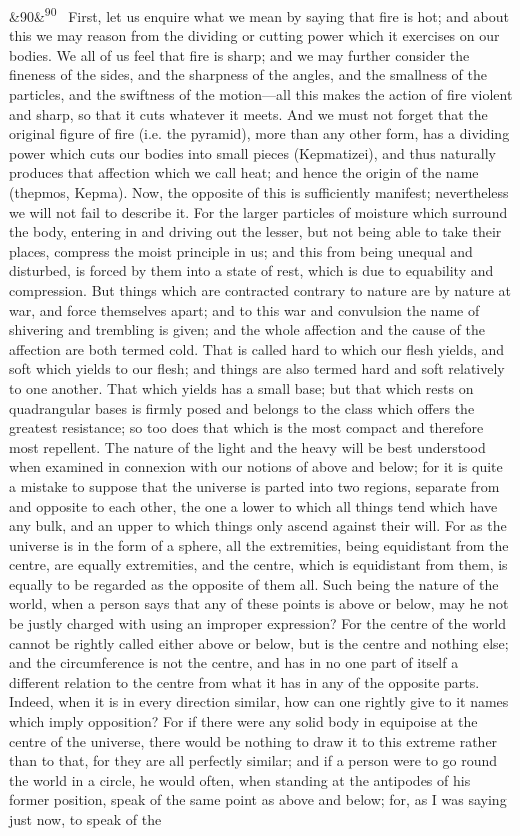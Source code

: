 \documentclass[12pt]{article}
\newcommand{\para}[1][]{\par\noindent\ifx&#1&\else\textsuperscript{\footnotesize #1}~\fi}
\begin{document}
\para[90] First, let us enquire what we mean by saying that fire is hot; and about this we may reason from the dividing or cutting power which it exercises on our bodies. We all of us feel that fire is sharp; and we may further consider the fineness of the sides, and the sharpness of the angles, and the smallness of the particles, and the swiftness of the motion---all this makes the action of fire violent and sharp, so that it cuts whatever it meets. And we must not forget that the original figure of fire (i.e. the pyramid), more than any other form, has a dividing power which cuts our bodies into small pieces (Kepmatizei), and thus naturally produces that affection which we call heat; and hence the origin of the name (thepmos, Kepma). Now, the opposite of this is sufficiently manifest; nevertheless we will not fail to describe it. For the larger particles of moisture which surround the body, entering in and driving out the lesser, but not being able to take their places, compress the moist principle in us; and this from being unequal and disturbed, is forced by them into a state of rest, which is due to equability and compression. But things which are contracted contrary to nature are by nature at war, and force themselves apart; and to this war and convulsion the name of shivering and trembling is given; and the whole affection and the cause of the affection are both termed cold. That is called hard to which our flesh yields, and soft which yields to our flesh; and things are also termed hard and soft relatively to one another. That which yields has a small base; but that which rests on quadrangular bases is firmly posed and belongs to the class which offers the greatest resistance; so too does that which is the most compact and therefore most repellent. The nature of the light and the heavy will be best understood when examined in connexion with our notions of above and below; for it is quite a mistake to suppose that the universe is parted into two regions, separate from and opposite to each other, the one a lower to which all things tend which have any bulk, and an upper to which things only ascend against their will. For as the universe is in the form of a sphere, all the extremities, being equidistant from the centre, are equally extremities, and the centre, which is equidistant from them, is equally to be regarded as the opposite of them all. Such being the nature of the world, when a person says that any of these points is above or below, may he not be justly charged with using an improper expression? For the centre of the world cannot be rightly called either above or below, but is the centre and nothing else; and the circumference is not the centre, and has in no one part of itself a different relation to the centre from what it has in any of the opposite parts. Indeed, when it is in every direction similar, how can one rightly give to it names which imply opposition? For if there were any solid body in equipoise at the centre of the universe, there would be nothing to draw it to this extreme rather than to that, for they are all perfectly similar; and if a person were to go round the world in a circle, he would often, when standing at the antipodes of his former position, speak of the same point as above and below; for, as I was saying just now, to speak of the 
\end{document}
